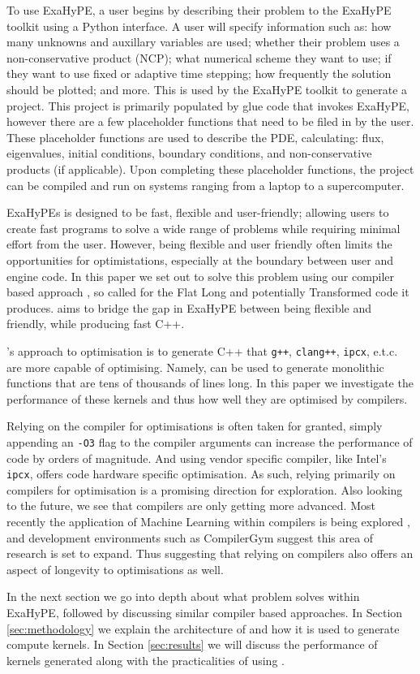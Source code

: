 To use ExaHyPE, a user begins by describing their problem to the ExaHyPE toolkit using a Python interface.
A user will specify information such as: how many unknowns and auxillary variables are used; whether their problem uses a non-conservative product (NCP); what numerical scheme they want to use; if they want to use fixed or adaptive time stepping; how frequently the solution should be plotted; and more.
This is used by the ExaHyPE toolkit to generate a project.
This project is primarily populated by glue code that invokes ExaHyPE, however there are a few placeholder functions that need to be filed in by the user.
These placeholder functions are used to describe the PDE, calculating: flux, eigenvalues, initial conditions, boundary conditions, and non-conservative products (if applicable).
Upon completing these placeholder functions, the project can be compiled and run on systems ranging from a laptop to a supercomputer.

ExaHyPEs is designed to be fast, flexible and user-friendly; allowing users to create fast programs to solve a wide range of problems while requiring minimal effort from the user.
However, being flexible and user friendly often limits the opportunities for optimistations, especially at the boundary between user and engine code.
In this paper we set out to solve this problem using our compiler based approach \phlat, so called for the Flat Long and potentially Transformed code it produces.
\phlat aims to bridge the gap in ExaHyPE between being flexible and friendly, while producing fast C++.  

\phlat{}'s approach to optimisation is to generate C++ that \texttt{g++}, \texttt{clang++}, \texttt{ipcx}, e.t.c. are more capable of optimising.  
Namely, \phlat can be used to generate monolithic functions that are tens of thousands of lines long.
In this paper we investigate the performance of these kernels and thus how well they are optimised by compilers.

Relying on the compiler for optimisations is often taken for granted, simply appending an \texttt{-O3} flag to the compiler arguments can increase the performance of code by orders of magnitude.
And using vendor specific compiler, like Intel's \texttt{ipcx}, offers code hardware specific optimisation.
As such, relying primarily on compilers for optimisation is a promising direction for exploration.
Also looking to the future, we see that compilers are only getting more advanced.
Most recently the application of Machine Learning within compilers is being explored \cite{compiler-ml-opt,lots-of-compiler-options}, and development environments such as CompilerGym \cite{compiler-gym} suggest this area of research is set to expand.
Thus suggesting that relying on compilers also offers an aspect of longevity to optimisations as well.

In the next section we go into depth about what problem \phlat solves within ExaHyPE, followed by discussing similar compiler based approaches.
In Section \ref{sec:methodology} we explain the architecture of \phlat and how it is used to generate compute kernels.
In Section \ref{sec:results} we will discuss the performance of kernels generated along with the practicalities of using \phlat.